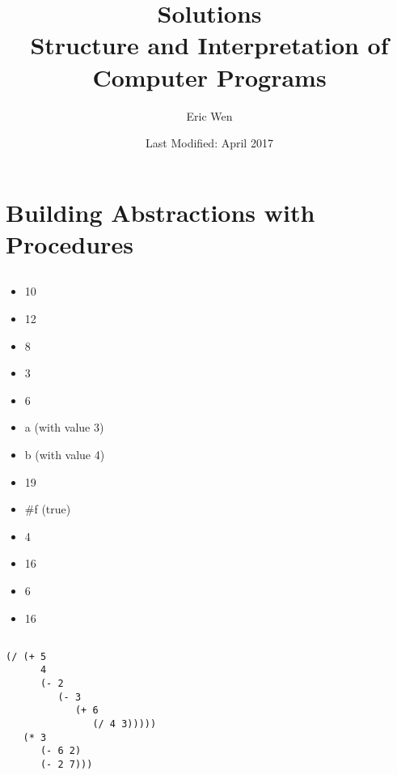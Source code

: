 \documentclass[a4paper]{report}
\begin{document}
\title{Solutions \\
\large Structure and Interpretation of Computer Programs}
\author{Eric Wen}
\date{Last Modified: April 2017}
\maketitle

\begin{multicols}{2}
	\tableofcontents
\end{multicols}

%
%

\chapter{Building Abstractions with Procedures}


\section{}

\begin{multicols}{2}
	\begin{itemize}
		\item 10
		\item 12
		\item 8
		\item 3
		\item 6
		\item a (with value 3)
		\item b (with value 4)
		\item 19
		\item \#f (true)
		\item 4
		\item 16
		\item 6
		\item 16
	\end{itemize}
\end{multicols}


\section{}

\begin{lstlisting}
(/ (+ 5
      4
      (- 2
         (- 3
            (+ 6
               (/ 4 3)))))
   (* 3
      (- 6 2)
      (- 2 7)))
\end{lstlisting}
\end{document}
